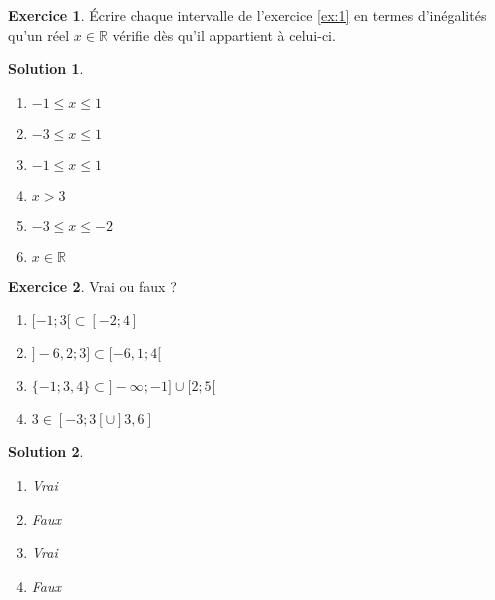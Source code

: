 \documentclass[a4paper, 14pt]{extarticle}
\theoremstyle{plain}
\newtheorem*{sol}{Solution}
\theoremstyle{definition}
\newtheorem{ex}{Exercice}
\newcommand{\R}{\mathbb{R}}
\newcommand{\exe}[2]{
		\begin{ex} #1  \end{ex}
		\begin{sol} #2 \end{sol}
	}
\newcommand{\exe}[2]{
		\begin{ex} #1  \end{ex}
	}
\begin{document}
\exe{
	Écrire chaque intervalle de l'exercice \ref{ex:1} en termes d'inégalités qu'un réel $x \in \R$ vérifie dès qu'il appartient à celui-ci.
}
{
	\begin{multicols}{2}
	\begin{enumerate}
		\item $-1 \leq x \leq 1$
		\item $-3 \leq x \leq 1$
		\item $-1 \leq x \leq 1$
		\item $x > 3$
		\item $-3 \leq x \leq -2$
		\item $x \in \R$
	\end{enumerate}
	\end{multicols}

}

\exe{
	Vrai ou faux ?
	
	\begin{multicols}{2}
	\begin{enumerate}
		\item $[-1; 3 [ \subset [-2 ; 4]$
		\item $] -6{,}2 ; 3] \subset [-6{,}1 ; 4[$
		\item $\{ -1; 3{,}4 \} \subset ]{-}\infty; -1] \cup [2; 5[$
		\item $ 3 \in [-3 ; 3[ \cup ]3, 6]$
	\end{enumerate}
	\end{multicols}
}{
	\begin{multicols}{2}
	\begin{enumerate}
		\item Vrai
		\item Faux
		\item Vrai
		\item Faux
	\end{enumerate}
	\end{multicols}

}
\end{document}
